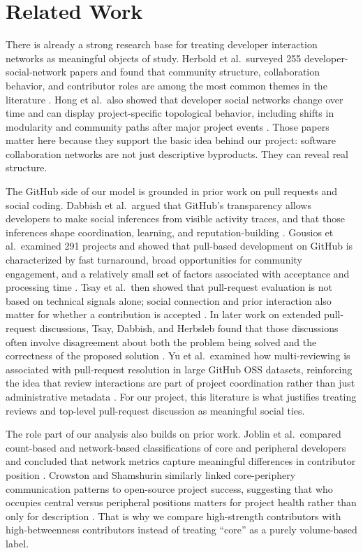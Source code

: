 \documentclass[11pt]{article}
\begin{document}
\section{Related Work}
There is already a strong research base for treating developer interaction networks as meaningful objects of study. Herbold et al.\ surveyed 255 developer-social-network papers and found that community structure, collaboration behavior, and contributor roles are among the most common themes in the literature \cite{herbold2021}. Hong et al.\ also showed that developer social networks change over time and can display project-specific topological behavior, including shifts in modularity and community paths after major project events \cite{hong2011}. Those papers matter here because they support the basic idea behind our project: software collaboration networks are not just descriptive byproducts. They can reveal real structure.

The GitHub side of our model is grounded in prior work on pull requests and social coding. Dabbish et al.\ argued that GitHub's transparency allows developers to make social inferences from visible activity traces, and that those inferences shape coordination, learning, and reputation-building \cite{dabbish2012}. Gousios et al.\ examined 291 projects and showed that pull-based development on GitHub is characterized by fast turnaround, broad opportunities for community engagement, and a relatively small set of factors associated with acceptance and processing time \cite{gousios2014}. Tsay et al.\ then showed that pull-request evaluation is not based on technical signals alone; social connection and prior interaction also matter for whether a contribution is accepted \cite{tsay2014}. In later work on extended pull-request discussions, Tsay, Dabbish, and Herbsleb found that those discussions often involve disagreement about both the problem being solved and the correctness of the proposed solution \cite{tsaydiscussion2014}. Yu et al.\ examined how multi-reviewing is associated with pull-request resolution in large GitHub OSS datasets, reinforcing the idea that review interactions are part of project coordination rather than just administrative metadata \cite{yu2019}. For our project, this literature is what justifies treating reviews and top-level pull-request discussion as meaningful social ties.

The role part of our analysis also builds on prior work. Joblin et al.\ compared count-based and network-based classifications of core and peripheral developers and concluded that network metrics capture meaningful differences in contributor position \cite{joblin2017}. Crowston and Shamshurin similarly linked core-periphery communication patterns to open-source project success, suggesting that who occupies central versus peripheral positions matters for project health rather than only for description \cite{crowston2017}. That is why we compare high-strength contributors with high-betweenness contributors instead of treating ``core'' as a purely volume-based label.
\end{document}
